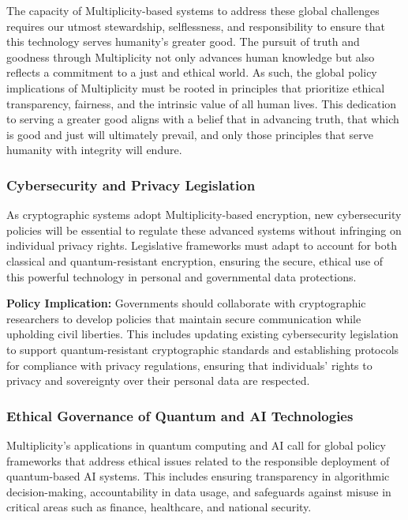 \documentclass{article}
\begin{document}
The capacity of Multiplicity-based systems to address these global challenges requires our utmost stewardship, selflessness, and responsibility to ensure that this technology serves humanity’s greater good. The pursuit of truth and goodness through Multiplicity not only advances human knowledge but also reflects a commitment to a just and ethical world. As such, the global policy implications of Multiplicity must be rooted in principles that prioritize ethical transparency, fairness, and the intrinsic value of all human lives. This dedication to serving a greater good aligns with a belief that in advancing truth, that which is good and just will ultimately prevail, and only those principles that serve humanity with integrity will endure.

\subsubsection{Cybersecurity and Privacy Legislation}

As cryptographic systems adopt Multiplicity-based encryption, new cybersecurity policies will be essential to regulate these advanced systems without infringing on individual privacy rights. Legislative frameworks must adapt to account for both classical and quantum-resistant encryption, ensuring the secure, ethical use of this powerful technology in personal and governmental data protections.

\textbf{Policy Implication:} Governments should collaborate with cryptographic researchers to develop policies that maintain secure communication while upholding civil liberties. This includes updating existing cybersecurity legislation to support quantum-resistant cryptographic standards and establishing protocols for compliance with privacy regulations, ensuring that individuals’ rights to privacy and sovereignty over their personal data are respected.

\subsubsection{Ethical Governance of Quantum and AI Technologies}

Multiplicity’s applications in quantum computing and AI call for global policy frameworks that address ethical issues related to the responsible deployment of quantum-based AI systems. This includes ensuring transparency in algorithmic decision-making, accountability in data usage, and safeguards against misuse in critical areas such as finance, healthcare, and national security.
\end{document}

